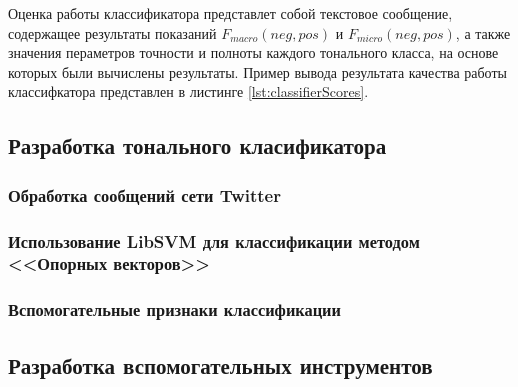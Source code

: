
    Оценка работы классификатора представлет собой текстовое сообщение,
    содержащее результаты показаний  $F_{macro}(neg, pos)$ и $F_{micro}(neg, pos)$,
    а также значения пераметров точности и полноты каждого тонального класса, на
    основе которых были вычислены результаты. Пример вывода результата
    качества работы классифкатора представлен в листинге \ref{lst:classifierScores}.

    \lstset{style=xml}
    

    \subsection{Разработка тонального класификатора}
        \subsubsection{Обработка сообщений сети Twitter}

        \subsubsection{Использование LibSVM для классификации методом <<Опорных векторов>>}

        \subsubsection{Вспомогательные признаки классификации}

    \subsection{Разработка вспомогательных инструментов}
